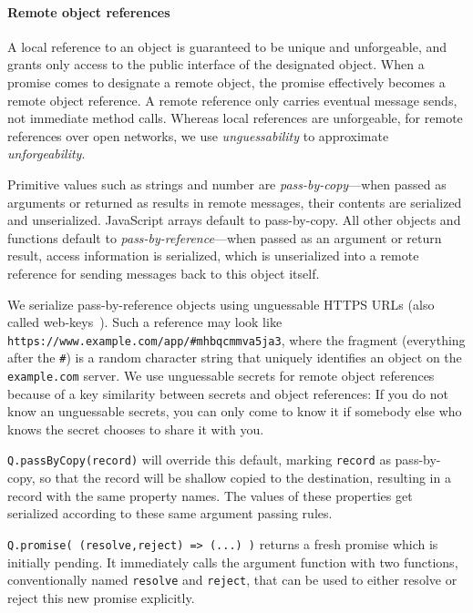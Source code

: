 \documentclass{llncs}
\begin{document}
\paragraph{Remote object references}

A local reference to an object is guaranteed to be unique and unforgeable, and grants only access to the public interface of the designated object. When a promise comes to designate a remote object, the promise effectively becomes a remote object reference. A remote reference only carries eventual message sends, not immediate method calls. Whereas local references are unforgeable, for remote references over open networks, we use \emph{unguessability} to approximate \emph{unforgeability}.

Primitive values such as strings and number are \emph{pass-by-copy}---when passed as arguments or returned as results in remote messages, their contents are serialized and unserialized. JavaScript arrays default to pass-by-copy. All other objects and functions default to \emph{pass-by-reference}---when passed as an argument or return result, access information is serialized, which is unserialized into a remote reference for sending messages back to this object itself.

We serialize pass-by-reference objects using unguessable HTTPS URLs (also called web-keys~\cite{Close:Webkeys}). Such a reference may look like {\tt https://www.example.com/app/\#mhbqcmmva5ja3}, where the fragment (everything after the {\tt \#}) is a random character string that uniquely identifies an object on the {\tt example.com} server. We use unguessable secrets for remote object references because of a key similarity between secrets and object references: If you do not know an unguessable secrets, you can only come to know it if somebody else who knows the secret chooses to share it with you.

\begin{description*}
\item[{\tt Q.passByCopy(record)}] will override this default, marking {\tt record} as pass-by-copy, so that the record will be shallow copied to the destination, resulting in a record with the same property names. The values of these properties get serialized according to these same argument passing rules.

\item[{\tt Q.promise( (resolve,reject) => (...) )}] returns a fresh promise which is initially pending. It immediately calls the argument function with two functions, conventionally named {\tt resolve} and {\tt reject}, that can be used to either resolve or reject this new promise explicitly. 

\end{description*}
\end{document}
